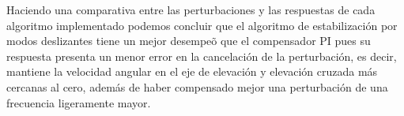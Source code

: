 Haciendo una comparativa entre las perturbaciones y las respuestas de cada algoritmo implementado podemos concluir que el algoritmo de estabilizaci\'{o}n por modos deslizantes tiene un mejor desempe\~{o} que el compensador PI pues su respuesta presenta un menor error en la cancelaci\'{o}n de la perturbaci\'{o}n, es decir, mantiene la velocidad angular en el eje de elevaci\'{o}n y elevaci\'{o}n cruzada m\'{a}s cercanas al cero, adem\'{a}s de haber compensado mejor una perturbaci\'{o}n de una frecuencia ligeramente mayor.  
